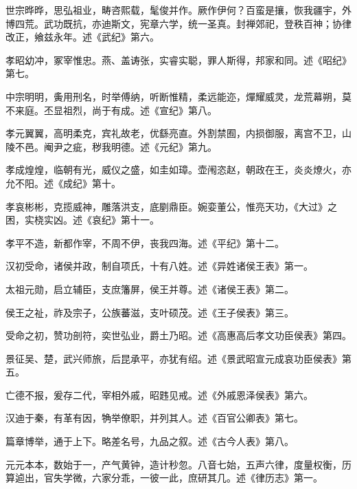 \documentclass[12pt,UTF8]{ctexbook}
\begin{document}
世宗晔晔，思弘祖业，畴咨熙载，髦俊并作。厥作伊何？百蛮是攘，恢我疆宇，外博四荒。武功既抗，亦迪斯文，宪章六学，统一圣真。封禅郊祀，登秩百神；协律改正，飨兹永年。述《武纪》第六。



孝昭幼冲，冢宰惟忠。燕、盖诪张，实睿实聪，罪人斯得，邦家和同。述《昭纪》第七。



中宗明明，夤用刑名，时举傅纳，听断惟精，柔远能迩，燀耀威灵，龙荒幕朔，莫不来庭。丕显祖烈，尚于有成。述《宣纪》第八。



孝元翼翼，高明柔克，宾礼故老，优繇亮直。外割禁囿，内损御服，离宫不卫，山陵不邑。阉尹之疵，秽我明德。述《元纪》第九。



孝成煌煌，临朝有光，威仪之盛，如圭如璋。壶闱恣赵，朝政在王，炎炎燎火，亦允不阳。述《成纪》第十。



孝哀彬彬，克揽威神，雕落洪支，底剭鼎臣。婉娈董公，惟亮天功，《大过》之困，实桡实凶。述《哀纪》第十一。



孝平不造，新都作宰，不周不伊，丧我四海。述《平纪》第十二。



汉初受命，诸侯并政，制自项氏，十有八姓。述《异姓诸侯王表》第一。



太祖元勋，启立辅臣，支庶籓屏，侯王并尊。述《诸侯王表》第二。



侯王之祉，祚及宗子，公族蕃滋，支叶硕茂。述《王子侯表》第三。



受命之初，赞功剖符，奕世弘业，爵土乃昭。述《高惠高后孝文功臣侯表》第四。



景征吴、楚，武兴师旅，后昆承平，亦犹有绍。述《景武昭宣元成哀功臣侯表》第五。



亡德不报，爰存二代，宰相外戚，昭韪见戒。述《外戚恩泽侯表》第六。



汉迪于秦，有革有因，觕举僚职，并列其人。述《百官公卿表》第七。



篇章博举，通于上下。略差名号，九品之叙。述《古今人表》第八。



元元本本，数始于一，产气黄钟，造计秒忽。八音七始，五声六律，度量权衡，历算逌出，官失学微，六家分乖，一彼一此，庶研其几。述《律历志》第一。
\end{document}
